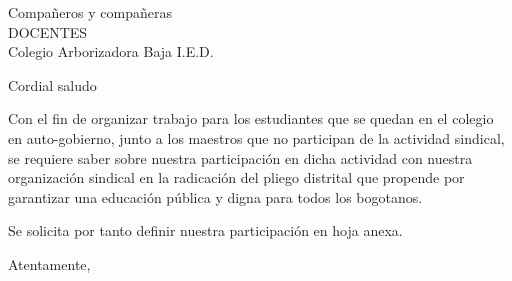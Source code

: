 \documentclass[letterpaper,spanish]{letter}
\date{23 de febrero de 2016}
\begin{document}
\begin{letter}{Compañeros y compañeras\\DOCENTES\\Colegio Arborizadora Baja I.E.D.}
	
\opening{Cordial saludo}
Con el fin de organizar trabajo para los estudiantes que se quedan en el colegio en auto-gobierno, junto a los maestros que no participan de la actividad sindical, se requiere saber sobre nuestra participación en dicha actividad  con nuestra organización sindical en la radicación del pliego distrital que propende por garantizar una educación pública y digna para todos los bogotanos.

Se solicita por tanto definir nuestra participación en hoja anexa.
\closing{Atentamente,}


\end{letter}
\end{document}
